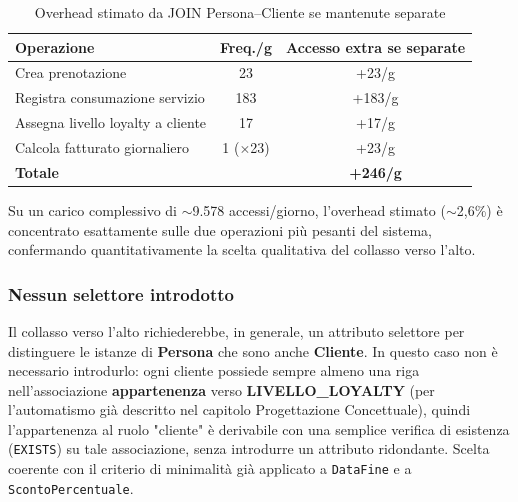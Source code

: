 \documentclass[a4paper,12pt]{report}
\begin{document}
\begin{table}[H]
    \centering
    \begin{tabular}{|l|c|c|}
        \hline
        \rowcolor{headerblue}
        \textbf{Operazione}               & \textbf{Freq./g} & \textbf{Accesso extra se separate} \\
        \hline
        Crea prenotazione                 & 23               & +23/g                              \\
        Registra consumazione servizio    & 183              & +183/g                             \\
        Assegna livello loyalty a cliente & 17               & +17/g                              \\
        Calcola fatturato giornaliero     & 1 ($\times$23)   & +23/g                              \\
        \hline
        \rowcolor{gray!25}
        \textbf{Totale}                   &                  & \textbf{+246/g}                    \\
        \hline
    \end{tabular}
    \caption{Overhead stimato da JOIN Persona--Cliente se mantenute separate}
\end{table}

Su un carico complessivo di $\sim$9.578 accessi/giorno, l'overhead
stimato ($\sim$2,6\%) è concentrato esattamente sulle due operazioni più
pesanti del sistema, confermando quantitativamente la scelta qualitativa
del collasso verso l'alto.

\subsubsection*{Nessun selettore introdotto}

Il collasso verso l'alto richiederebbe, in generale, un attributo
selettore per distinguere le istanze di \textbf{Persona} che sono anche
\textbf{Cliente}. In questo caso non è necessario introdurlo: ogni
cliente possiede sempre almeno una riga nell'associazione
\textbf{appartenenza} verso \textbf{LIVELLO\_LOYALTY} (per l'automatismo
già descritto nel capitolo Progettazione Concettuale), quindi
l'appartenenza al ruolo "cliente" è derivabile con una semplice verifica
di esistenza (\texttt{EXISTS}) su tale associazione, senza introdurre un
attributo ridondante. Scelta coerente con il criterio di minimalità già
applicato a \texttt{DataFine} e a \texttt{ScontoPercentuale}.
\end{document}
